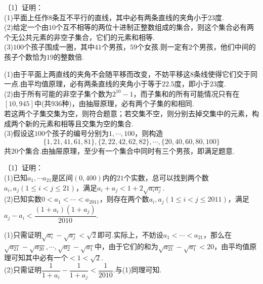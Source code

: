\documentclass[lang=cn, zihao=4.5]{elegantbook}
\newcommand{\nd}[1]{〔#1〕}
\begin{document}
\begin{example} %
	\nd{1}证明： \\
	(1)平面上任作$8$条互不平行的直线，其中必有两条直线的夹角小于$23$度. \\
	(2)给定一个由$10$个互不相等的两位十进制正整数组成的集合，则这个集合必有两个无公共元素的非空子集合，它们的元素和相等. \\
	(3)$100$个孩子围成一圈，其中$41$个男孩，$59$个女孩.则一定有$2$个男孩，他们中间的孩子个数恰为$19$的整数倍.
\end{example}
\begin{solution}
	(1)由于平面上两直线的夹角不会随平移而改变，不妨平移这$8$条线使得它们交于同一点.由平均值原理，必有两条直线的夹角小于等于$22.5$度，即小于$23$度. \\
	(2)由于所有可能的非空子集个数为$2^{10}-1$，而子集和的所有可能情况只有在$[10,945]$中(共$936$种)，由抽屉原理，必有两个子集的和相同. \\
	若这两个子集交集为空，则符合题意；若交集不空，则分别去掉交集中的元素，构成两个新的元素和相等且交集为空的集合. \\
	(3)假设这$100$个孩子的编号分别为$1, \cdots ,100$，则构造$$\{ 1,21,41,61,81 \}, \{ 2,22,42,62,82 \}, \cdots ,\{ 20,40,60,80,100 \}$$
	共$20$个集合.由抽屉原理，至少有一个集合中同时有三个男孩，即满足题意.
\end{solution}

\begin{example} %
	\nd{1}证明： \\
	(1)已知$a_1, \cdots a_{21}$是区间$(0,400)$内的$21$个实数，总可以找到两个数$a_i,a_j(1 \leq i < j \leq 21)$，满足$a_i+a_j < 1+2\sqrt{a_ia_j}$. \\
	(2)已知实数$0<a_1 < \cdots < a_{2011}$，则存在两个数$a_i,a_j(1 \leq i < j \leq 2011)$，满足$a_j-a_i < \dfrac{(1+a_i)(1+a_j)}{2010}$.
\end{example}
\begin{solution}
	(1)只需证明$\sqrt{a_i}-\sqrt{a_j}<\sqrt{2}$即可.实际上，不妨设$a_1<\cdots <a_{21}$，那么在$\sqrt{a_{21}}-\sqrt{a_{20}}, \cdots ,\sqrt{a_2}-\sqrt{a_1}$中，由于它们的和为$\sqrt{a_{21}}-\sqrt{a_1} < 20$，由平均值原理可知其中必有一个$<1<\sqrt{2}$. \\
	(2)只需证明$\dfrac{1}{1+a_i}-\dfrac{1}{1+a_j} < \dfrac{1}{2010}$.与(1)同理可知.
\end{solution}
\end{document}
